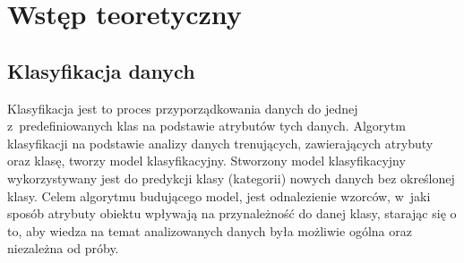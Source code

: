 
\chapter{Wstęp teoretyczny}
\section{Klasyfikacja danych}

Klasyfikacja jest to proces przyporządkowania danych do jednej z predefiniowanych klas na podstawie atrybutów tych danych. Algorytm klasyfikacji na podstawie analizy danych trenujących, zawierających atrybuty oraz klasę, tworzy model klasyfikacyjny. Stworzony model klasyfikacyjny wykorzystywany jest do predykcji klasy (kategorii) nowych danych bez określonej klasy. Celem algorytmu budującego model, jest  odnalezienie wzorców, w jaki sposób atrybuty obiektu wpływają na przynależność do danej klasy, starając się o to, aby wiedza na temat analizowanych danych była możliwie ogólna oraz niezależna od próby.

